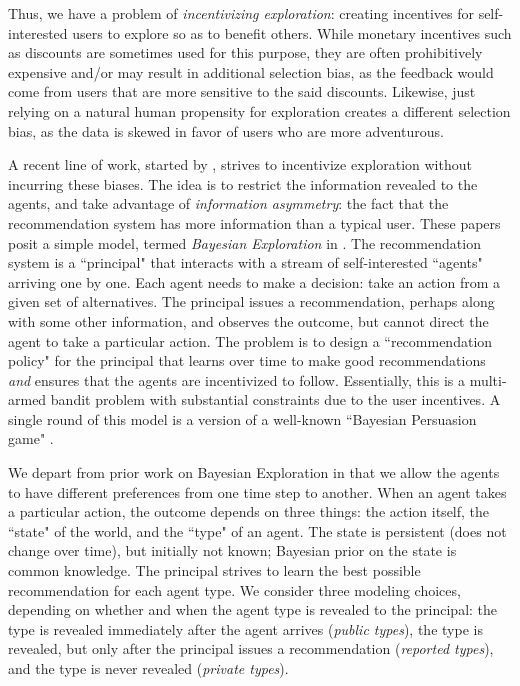 Thus, we have a problem of \emph{incentivizing exploration}: creating incentives for self-interested users to explore so as to benefit others. While monetary incentives such as discounts are sometimes used for this purpose, they are often prohibitively expensive and/or may result in additional selection bias, as the feedback would come from users that are more sensitive to the said discounts. Likewise, just relying on a natural human propensity for exploration creates a different selection bias, as the data is skewed in favor of users who are more adventurous.

A recent line of work, started by \cite{Kremer-JPE14}, strives to incentivize exploration without incurring these biases. The idea is to restrict the information revealed to the agents, and take advantage of \emph{information asymmetry}: the fact that the recommendation system has more information than a typical user. These papers posit a simple model, termed \emph{Bayesian Exploration} in \cite{ICexplorationGames-ec16}. The recommendation system is a ``principal" that interacts with a stream of self-interested ``agents" arriving one by one. Each agent needs to make a decision: take an action from a given set of alternatives. The principal issues a recommendation, perhaps along with some other information, and observes the outcome, but cannot direct the agent to take a particular action. The problem is to design a ``recommendation policy" for the principal that learns over time to make good recommendations \emph{and} ensures that the agents are incentivized to follow. Essentially, this is a multi-armed bandit problem with substantial constraints due to the user incentives. A single round of this model is a version of a well-known ``Bayesian Persuasion game" \cite{Kamenica-aer11}.

We depart from prior work on Bayesian Exploration in that we allow the agents to have different preferences from one time step to another. When an agent takes a particular action, the outcome depends on three things: the action itself, the ``state" of the world, and the ``type" of an agent. The state is persistent (does not change over time), but initially not known; Bayesian prior on the state is common knowledge. The principal strives to learn the best possible recommendation for each agent type. We consider three modeling choices, depending on whether and when the agent type is revealed to the principal: the type is revealed immediately after the agent arrives (\emph{public types}), the type is revealed, but only after the principal issues a recommendation (\emph{reported types}), and the type is never revealed (\emph{private types}). 

